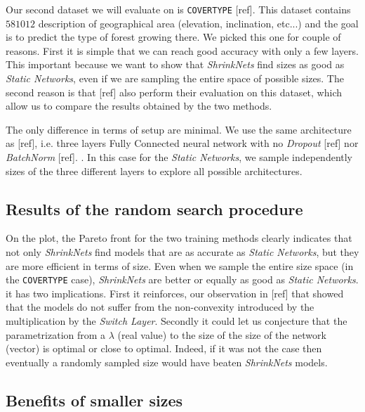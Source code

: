 Our second dataset we will evaluate on is \texttt{COVERTYPE} [ref]. This dataset
contains $581012$ description of geographical area (elevation, inclination,
etc...) and the goal is to predict the type of forest growing there. We picked
this one for couple of reasons. First it is simple that we can reach good
accuracy with only a few layers. This important because we want to show that
\textit{ShrinkNets} find sizes as good as \textit{Static Networks}, even if we
are sampling the entire space of possible sizes. The second reason is that [ref]
also perform their evaluation on this dataset, which allow us to compare the
results obtained by the two methods.

The only difference in terms of setup are minimal. We use the same architecture
as [ref], i.e. three layers Fully Connected neural network with  no
\textit{Dropout} [ref] nor \textit{BatchNorm} [ref]. . In this case for the \textit{Static Networks}, we sample
independently sizes of the three different layers to explore all possible
architectures.

\subsection{Results of the random search procedure}

On the plot, the Pareto front for the two training methods clearly indicates
that not only \textit{ShrinkNets} find models that are as accurate as
\textit{Static Networks}, but they are more efficient in terms of size. Even
when we sample the entire size space (in the \texttt{COVERTYPE} case),
\textit{ShrinkNets} are better or equally as good as \textit{Static Networks}.
it has two implications. First it reinforces, our observation in [ref] that
showed that the models do not suffer from the non-convexity introduced by the
multiplication by the \textit{Switch Layer}. Secondly it could let us conjecture
that the parametrization from a $\lambda$ (real value) to the size of the
size of the network (vector) is optimal or close to optimal. Indeed, if it was
not the case then eventually a randomly sampled size would have beaten
\textit{ShrinkNets} models. 

\subsection{Benefits of smaller sizes}

